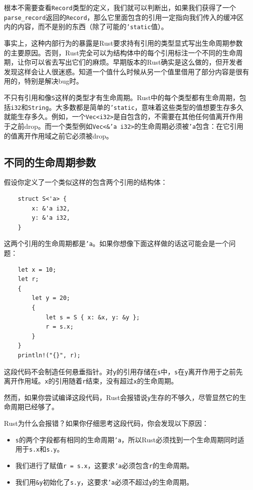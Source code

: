 根本不需要查看\texttt{Record}类型的定义，我们就可以判断出，如果我们获得了一个\\
\texttt{parse\_record}返回的\texttt{Record}，那么它里面包含的引用一定指向我们传入的缓冲区内的内容，而不是别的东西（除了可能的\texttt{'static}值）。

事实上，这种内部行为的暴露是Rust要求持有引用的类型显式写出生命周期参数的主要原因。否则，Rust完全可以为结构体中的每个引用标注一个不同的生命周期，让你可以省去写出它们的麻烦。早期版本的Rust确实是这么做的，但开发者发现这样会让人很迷惑。知道一个值什么时候从另一个值里借用了部分内容是很有用的，特别是解决bug时。

不只有引用和像\texttt{S}这样的类型才有生命周期。Rust中的每个类型都有生命周期，包括\texttt{i32}和\texttt{String}。大多数都是简单的\texttt{'static}，意味着这些类型的值想要生存多久就能生存多久。例如，一个\texttt{Vec<i32>}是自包含的，不需要在其他任何值离开作用于之前drop。而一个类型例如\texttt{Vec<\&'a i32>}的生命周期必须被\texttt{'a}包含：在它引用的值离开作用域之前它必须被drop。

\subsection{不同的生命周期参数}\label{DistLife}
假设你定义了一个类似这样的包含两个引用的结构体：
\begin{verbatim}
    struct S<'a> {
        x: &'a i32,
        y: &'a i32,
    }
\end{verbatim}

这两个引用的生命周期都是\texttt{'a}。如果你想像下面这样做的话这可能会是一个问题：
\begin{verbatim}
    let x = 10;
    let r;
    {
        let y = 20;
        {
            let s = S { x: &x, y: &y };
            r = s.x;
        }
    }
    println!("{}", r);
\end{verbatim}

这段代码不会制造任何悬垂指针。对\texttt{y}的引用存储在\texttt{s}中，\texttt{s}在\texttt{y}离开作用于之前先离开作用域。\texttt{x}的引用随着\texttt{r}结束，没有超过\texttt{x}的生命周期。

然而，如果你尝试编译这段代码，Rust会报错说\texttt{y}生存的不够久，尽管显然它的生命周期已经够了。

Rust为什么会报错？如果你仔细思考这段代码，你会发现以下原因：
\begin{itemize}
    \item \texttt{s}的两个字段都有相同的生命周期\texttt{'a}，所以Rust必须找到一个生命周期同时适用于\texttt{s.x}和\texttt{s.y}。
    \item 我们进行了赋值\texttt{r = s.x}，这要求\texttt{'a}必须包含\texttt{r}的生命周期。
    \item 我们用\texttt{\&y}初始化了\texttt{s.y}，这要求\texttt{'a}必须不超过\texttt{y}的生命周期。
\end{itemize}

